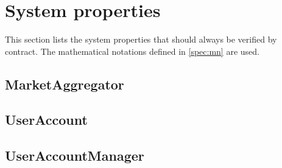 
\section{System properties}

This section lists the system properties that should always be verified by contract. The mathematical notations defined in \ref{spec:mn} are used.

\subsection{MarketAggregator}

\subsection{UserAccount}

\subsection{UserAccountManager}
